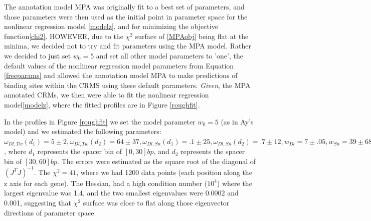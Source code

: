The annotation model MPA was originally fit to a best set of parameters, and those parameters were then used as the initial point in parameter space for the nonlinear regression model \ref{modelz}, and for minimizing the objective function\ref{chi2}.  HOWEVER, due to the $\chi^2$ surface of \ref{MPAobj} being flat at the minima, we decided not to try and fit parameters using the MPA model. Rather we decided to just set $w_0 =5$ and set all other model parameters to 'one', the default values of the nonlinear regression model parameters from Equation \ref{freeparams} and allowed the annotation model MPA to make predictions of binding sites within the CRMS using these default parameters.  \emph{Given}, the MPA annotated CRMs, we then were able to fit the nonlinear regression model\ref{modelz}, where the fitted profiles are in Figure \ref{roughfit}.

In the profiles in Figure \ref{roughfit} we set the model parameter $w_0 =5$ (as in Ay's model) and we estimated the following parameters: $\omega_{Dl,Tw}(d_1)= 5\pm 2 , 	\omega_{Dl,Tw}(d_2) = 64\pm 37 , 	\omega_{Dl,Sn}(d_1)=.1 \pm 25 ,	\omega_{Dl,Sn}(d_2)=.7 \pm 12,	w_{Dl}=7 \pm .05	,w_{Sn}=39 \pm 687 $, where $d_1$ represents the spacer bin of $[0,30]bp$, and $d_2$ represents the spacer bin of $[30,60]bp$.  The errors were estimated as the square root of the diagonal of $(J^TJ)^{-1}$.  The $\chi^2=41$, where we had 1200 data points (each position along the z axis for each gene).  The Hessian, had a high condition number ($10^4$) where the largest eigenvalue was 1.4, and the two smallest eigenvalues were 0.0002 and 0.001, suggesting that $\chi^2$ surface was close to flat along those eigenvector directions of parameter space.



%	
%	
%

